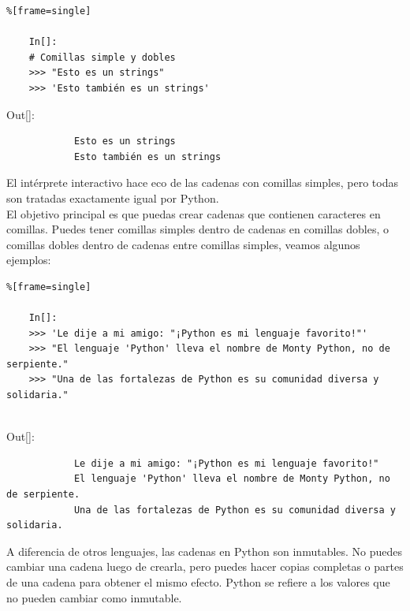 \begin{lstlisting}%[frame=single]
	
	In[]:
	# Comillas simple y dobles	
	>>> "Esto es un strings"   
	>>> 'Esto también es un strings'	
\end{lstlisting}

{\ttfamily\scriptsize\scriptsize 
	\hspace{-0.65cm}Out[]:\vspace{-0.15cm}	
	{\color{blue} 	
		\begin{verbatim}
			Esto es un strings   
			Esto también es un strings
		\end{verbatim}
}}


El intérprete interactivo hace eco de las cadenas con  comillas simples, pero todas son tratadas exactamente
igual  por Python. \\


El objetivo principal es que puedas crear cadenas que contienen caracteres en comillas. Puedes tener comillas simples dentro de cadenas en comillas dobles, o comillas dobles dentro de cadenas entre comillas simples,   veamos  algunos ejemplos: 

\begin{lstlisting}%[frame=single]
	
	In[]:	
	>>> 'Le dije a mi amigo: "¡Python es mi lenguaje favorito!"'	
	>>> "El lenguaje 'Python' lleva el nombre de Monty Python, no de serpiente."
	>>> "Una de las fortalezas de Python es su comunidad diversa y solidaria."
	
\end{lstlisting}


{\ttfamily\scriptsize\scriptsize 
	\hspace{-0.65cm}Out[]:\vspace{-0.15cm}	
	{\color{blue} 	
		\begin{verbatim}
			Le dije a mi amigo: "¡Python es mi lenguaje favorito!"
			El lenguaje 'Python' lleva el nombre de Monty Python, no de serpiente.
			Una de las fortalezas de Python es su comunidad diversa y solidaria.
		\end{verbatim}
}}


A diferencia de otros lenguajes, las cadenas en Python son inmutables.  No puedes cambiar una cadena
luego de crearla, pero puedes hacer copias completas o partes de una cadena para obtener el mismo efecto. 
Python se refiere a los valores que no pueden cambiar como inmutable.

